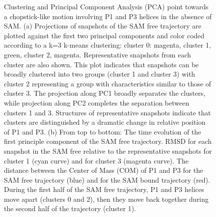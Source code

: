 \documentclass[a4paper,10pt]{article}
\begin{document}
\begin{figure}
\caption{Clustering and Principal Component Analysis (PCA) point towards a chopstick-like 
motion involving P1 and P3 helices in the absence of SAM. 
(a) Projections of snapshots of the SAM free trajectory are plotted against the first two principal 
components and color coded according to a k=3 k-means clustering: cluster 0: magenta, cluster 1, 
green, cluster 2, magenta. Representative snapshots from each cluster are also shown. This plot 
indicates that snapshots can be broadly clustered into two groups (cluster 1 and cluster 3) with 
cluster 2 representing a group with characteristics similar to those of cluster 3. The projection 
along PC1 broadly separates the clusters, while projection along PC2 completes the separation 
between clusters 1 and 3. Structures of representative snapshots indicate that clusters are 
distinguished by a dramatic change in relative position of P1 and P3. (b) From top to bottom: 
The time evolution of the first principle component of the SAM free trajectory. RMSD for each snapshot in the SAM free relative to the 
representative snapshots for cluster 1 (cyan curve) and for cluster 3 (magenta curve). The 
distance between the Center of Mass (COM) of P1 and P3 for the SAM free trajectory (blue) and for 
the SAM bound trajectory (red).  During the first half of the SAM free trajectory, P1 and P3 helices move apart 
(clusters 0 and 2), then they move back together during the second half of the trajectory (cluster 
1).}
\end{figure}
\end{document}
